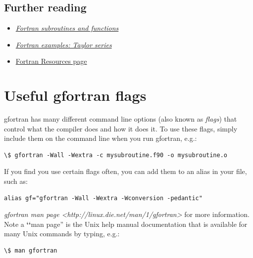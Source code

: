 \documentclass[letterpaper,10pt,english]{sphinxmanual}
\begin{document}
\subsection{Further reading}
\label{fortran:further-reading}\begin{itemize}
\item {} 
{\hyperref[fortran_sub:fortran-sub]{\emph{Fortran subroutines and functions}}}

\item {} 
{\hyperref[fortran_taylor:fortran-taylor]{\emph{Fortran examples: Taylor series}}}

\item {} 
\href{http://www.personal.psu.edu/hdk/fortran.html}{Fortran Resources page}

\end{itemize}


\section{Useful gfortran flags}
\label{gfortran_flags:useful-gfortran-flags}\label{gfortran_flags::doc}\label{gfortran_flags:gfortran-flags}
gfortran has many different command line options (also known as
\emph{flags}) that control what the compiler does and how it does it.  To
use these flags, simply include them on the command line when you run
gfortran, e.g.:

\begin{Verbatim}[commandchars=\\\{\}]
\$ gfortran -Wall -Wextra -c mysubroutine.f90 -o mysubroutine.o
\end{Verbatim}

If you find you use certain flags often, you can add them to an alias
in your  file, such as:

\begin{Verbatim}[commandchars=\\\{\}]
alias gf="gfortran -Wall -Wextra -Wconversion -pedantic"
\end{Verbatim}

\emph{gfortran man page \textless{}http://linux.die.net/man/1/gfortran\textgreater{}}
for more information.
Note a {\color{red}\bfseries{}{}`{}`}man page'' is the Unix help manual documentation that is available
for many Unix commands by typing, e.g.:

\begin{Verbatim}[commandchars=\\\{\}]
\$ man gfortran
\end{Verbatim}
\end{document}
